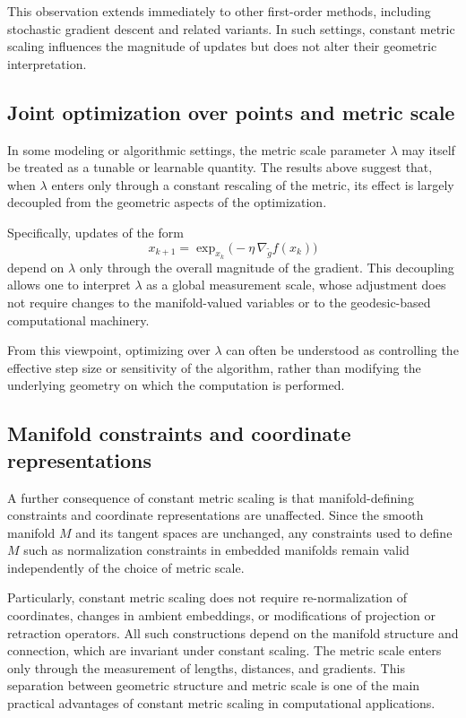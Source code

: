 \documentclass[11pt]{article}
\begin{document}
This observation extends immediately to other first-order methods, including
stochastic gradient descent and related variants. In such settings, constant
metric scaling influences the magnitude of updates but does not alter their
geometric interpretation.

\subsection{Joint optimization over points and metric scale}

In some modeling or algorithmic settings, the metric scale parameter $\lambda$
may itself be treated as a tunable or learnable quantity. The results above
suggest that, when $\lambda$ enters only through a constant rescaling of the
metric, its effect is largely decoupled from the geometric aspects of the
optimization.


Specifically, updates of the form
\[
x_{k+1} = \exp_{x_k}\bigl(-\eta \, \nabla_{\tilde g} f(x_k)\bigr)
\]
depend on $\lambda$ only through the overall magnitude of the gradient. This
decoupling allows one to interpret $\lambda$ as a global measurement scale,
whose adjustment does not require changes to the manifold-valued variables or
to the geodesic-based computational machinery.

From this viewpoint, optimizing over $\lambda$ can often be understood as
controlling the effective step size or sensitivity of the algorithm, rather
than modifying the underlying geometry on which the computation is performed.

\subsection{Manifold constraints and coordinate representations}

A further consequence of constant metric scaling is that manifold-defining
constraints and coordinate representations are unaffected. Since the smooth
manifold $M$ and its tangent spaces are unchanged, any constraints used to
define $M$ such as normalization constraints in embedded manifolds remain valid
independently of the choice of metric scale.

Particularly, constant metric scaling does not require re-normalization of
coordinates, changes in ambient embeddings, or modifications of projection or
retraction operators. All such constructions depend on the manifold structure
and connection, which are invariant under constant scaling. The metric scale
enters only through the measurement of lengths, distances, and gradients. This separation between geometric structure and metric scale is one of the main
practical advantages of constant metric scaling in computational applications.
\end{document}
